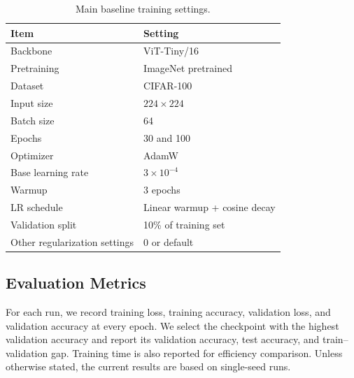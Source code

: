 \begin{table}[!htbp]
\centering
\caption{Main baseline training settings.}
\label{tab:baseline_config}
\small
\setlength{\tabcolsep}{5pt}
\renewcommand{\arraystretch}{1.05}
\begin{tabular}{ll}
\hline
Item & Setting \\
\hline
Backbone & ViT-Tiny/16 \\
Pretraining & ImageNet pretrained \\
Dataset & CIFAR-100 \\
Input size & $224 \times 224$ \\
Batch size & 64 \\
Epochs & 30 and 100 \\
Optimizer & AdamW \\
Base learning rate & $3\times10^{-4}$ \\
Warmup & 3 epochs \\
LR schedule & Linear warmup + cosine decay \\
Validation split & 10\% of training set \\
Other regularization settings & 0 or default \\
\hline
\end{tabular}
\end{table}

\subsection{Evaluation Metrics}
\label{sec:exp:eval}
For each run, we record training loss, training accuracy, validation
loss, and validation accuracy at every epoch. We select the checkpoint
with the highest validation accuracy and report its validation accuracy,
test accuracy, and train--validation gap. Training time is also
reported for efficiency comparison. Unless otherwise stated, the current
results are based on single-seed runs.